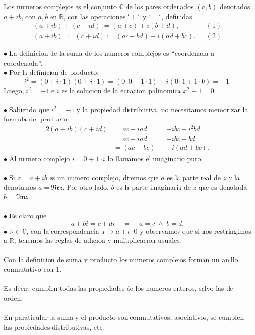 \documentclass{article}
\theoremstyle{definition}
\theoremstyle{definition}
\theoremstyle{remark}
\newcommand\bl{$\bullet\;$}
\begin{document}
\begin{defi}
  Los numeros complejos es el conjunto $\mathbb{C}$ de los pares ordenados $(a,b)$ denotados $a+ib$, con $a,b$ en $\mathbb{R}$, con las operaciones $`+`$ y $`-`$, definidas\\
  $$\begin{array}{llll}
    (a+ib)+(c+id) := (a+c) + i(b+d), & & (1) \\
    (a+ib) \phantom{\cdot}\cdot\phantom{\cdot}(c+id) := (ac-bd)+i(ad+bc). & & (2)
  \end{array}$$
\end{defi}
\bl La definicion de la suma de los numeros complejos es ``coordenada a coordenada''. \\
\bl Por la definicion de producto: \[
i^2 = (0+i \cdot 1)(0+i \cdot 1) = (0 \cdot 0 - 1 \cdot 1 ) + i(0 \cdot 1 + 1 \cdot 0) = -1.
\]
Luego, $i^2=-1$ e $i$ es la solucion de la ecuacion polinomica $x^2+1=0$.
\\\\
\bl Sabiendo que $i^2=-1$ y la propiedad distributiva, no necesitamos memorizar la formula del producto:  
  \begin{alignat*}{2}
    (a+ib)(c+id) &= ac+iad &&+ ibc+i^2bd \\
                 &= ac+iad &&+ ibc-bd \\
                 &= (ac - bc) &&+ i(ad+bc).
  \end{alignat*}
\bl Al numero complejo $i=0+1\cdot i$ lo llamamos el imaginario puro.\\\\
\bl Si $z=a+ib$ es un numero complejo, diremos que $a$ es la parte real de $z$ y la denotamos $a=\mathfrak{Re}z$. Por otro lado, $b$ es la parte imaginaria de $z$ que es denotada $b=\mathfrak{Im}z$.\\\\
\bl Es claro que \[
a+bi=c+di \quad \Leftrightarrow \quad a=c \; \land \; b=d.
\]
\bl $\mathbb{R} \in \mathbb{C}$, con la correspondencia $a \to a+i\cdot 0$ y observamos que si nos restringimos a $\mathbb{R}$, tenemos las reglas de adicion y multiplicacion usuales.
\\\\
Con la definicion de suma y producto los numeros complejos forman un anillo conmutativo con $1$.\\\\ Es decir, cumplen todas las propiedades de los numeros enteros, salvo las de orden.
\\\\ En paraticular la suma y el producto son conmutativos, asociativos, se cumplen las propiedades distributivas, etc.
\end{document}
